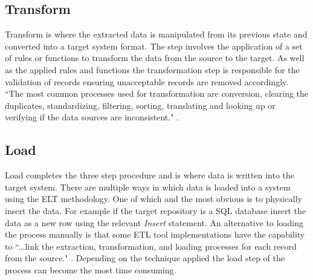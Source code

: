 \subsection{Transform}
Transform is where the extracted data is manipulated from its previous state and converted into a target system format. The step involves the application of a set of rules or functions to transform the data from the source to the target. As well as the applied rules and functions the transformation step is responsible for the validation of records ensuring unacceptable records are removed accordingly. ``The most common processes used for transformation are conversion, clearing the duplicates, standardizing, filtering, sorting, translating and looking up or verifying if the data sources are inconsistent." \cite{etlref2}.

\subsection{Load}
Load completes the three step procedure and is where data is written into the target system. There are multiple ways in which data is loaded into a system using the ELT methodology. One of which and the most obvious is to physically insert the data. For example if the target repository is a SQL database insert the data as a new row using the relevant \textit{Insert} statement. An alternative to loading the process manually is that some ETL tool implementations have the capability to ``...link the extraction, transformation, and loading processes for each record from the source." \cite{etlref2}. Depending on the technique applied the load step of the process can become the most time consuming.
